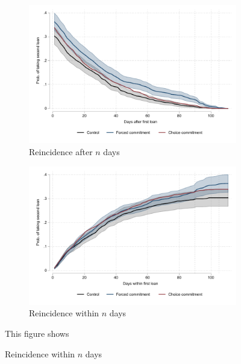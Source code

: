 \documentclass[oneside,11pt]{article}
\begin{document}
\begin{figure}[H]
     \caption{Probability of ever pawning again}
    \label{prob_ever_pawn}
    \begin{center}
  \begin{subfigure}{0.49\textwidth}
     \caption{Reincidence after $n$ days}
        \centering
        \includegraphics[width=\textwidth]{Figuras/prob_reincidence_after.pdf}
    \end{subfigure}        
    \begin{subfigure}{0.49\textwidth}
     \caption{Reincidence within $n$ days}
        \centering
        \includegraphics[width=\textwidth]{Figuras/prob_reincidence_within.pdf}
    \end{subfigure}
    \end{center}
    \scriptsize
    This figure shows
\end{figure}
\end{document}
